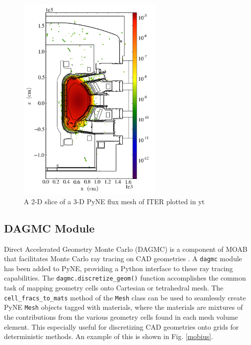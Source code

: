\documentclass{anstrans}
\begin{document}
\begin{figure}
    \centering
    \includegraphics[width=7.0cm, angle =0]{flux_slice.png}
    \caption{A 2-D slice of a 3-D PyNE flux mesh of ITER plotted in yt}
    \label{ITER}
\end{figure}


\subsection{DAGMC Module}

Direct Accelerated Geometry Monte Carlo (DAGMC) is a component of MOAB that
facilitates Monte Carlo ray tracing on CAD geometries
\cite{tautges_acceleration_2009}.  A \texttt{dagmc} module has been added to
PyNE, providing a Python interface to these ray tracing capabilities. The
\texttt{dagmc.discretize\_geom()} function accomplishes the common task of
mapping geometry cells onto Cartesian or tetrahedral mesh. The
\texttt{cell\_fracs\_to\_mats} method of the \texttt{Mesh} class can be used
to seamlessly create PyNE \texttt{Mesh} objects tagged with materials, where
the materials are mixtures of the contributions from the various geometry cells
found in each mesh volume element. This especially useful for discretizing CAD
geometries onto grids for deterministic methods. An example of this is shown in
Fig. \ref{mobius}.
\end{document}
